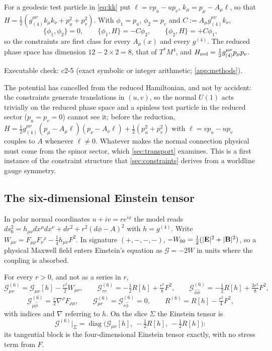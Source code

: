 \begin{proposition}
\label{prop:constraints}
For a geodesic test particle in \eqref{eq:kk} put $\ell=vp_u-up_v$, $k_\mu=p_\mu-A_\mu\ell$, so that $H=\tfrac12(g_{(4)}^{\mu\nu}k_\mu k_\nu+p_u^2+p_v^2)$. With
$\phi_1=p_u$, $\phi_2=p_v$ and $C:=A_\mu g_{(4)}^{\mu\nu}k_\nu$,
\[
\{\phi_1,\phi_2\}=0,\qquad \{\phi_1,H\}=-C\phi_2,\qquad \{\phi_2,H\}=+C\phi_1 ,
\]
so the constraints are first class for every $A_\mu(x)$ and every $g^{(4)}$. The reduced phase space has dimension $12-2\times2=8$, that of $T^*M^4$, and
$H_{\rm red}=\tfrac12g_{(4)}^{\mu\nu}p_\mu p_\nu$.
\end{proposition}

\noindent Executable check: c2-5 (exact symbolic or integer arithmetic; \cref{app:methods}).

The potential has cancelled from the reduced Hamiltonian, and not by accident: the constraints generate translations in $(u,v)$, so the normal $U(1)$
acts trivially on the reduced phase space and a spinless test particle in the reduced sector ($p_u=p_v=0$) cannot see it; before the reduction,
$H=\tfrac12g_{(4)}^{\mu\nu}(p_\mu-A_\mu\ell)(p_\nu-A_\nu\ell)+\tfrac12(p_u^2+p_v^2)$ with $\ell=vp_u-up_v$ couples to $A$ whenever $\ell\neq0$. Whatever makes the normal connection physical must come from the
spinor sector, which \cref{sec:transport} examines. This is a first instance of the constraint structure that \cref{sec:constraints} derives from a
worldline gauge symmetry.

\subsection{The six-dimensional Einstein tensor}
\label{sec:ambientEin}

In polar normal coordinates $u+iv=re^{i\phi}$ the model reads $ds_6^2=h_{\mu\nu}dx^\mu dx^\nu+dr^2+r^2(d\phi-A)^2$ with $h=g^{(4)}$. Write
$W_{\mu\nu}=F_{\mu\rho}F_\nu{}^\rho-\tfrac14h_{\mu\nu}F^2$. In signature $(+,-,-,-)$, $-W_{00}=\tfrac12(|\mathbf E|^2+|\mathbf B|^2)$, so a physical Maxwell field enters
Einstein's equation as $\mathcal G=-2W$ in units where the coupling is absorbed.

\begin{theorem}
\label{thm:ein6}
For every $r>0$, and not as a series in $r$,
\[
\mathcal G^{(6)}_{\mu\nu}=\mathcal G_{\mu\nu}[h]-\tfrac{r^2}2W_{\mu\nu},\qquad \mathcal G^{(6)}_{rr}=-\tfrac12R[h]+\tfrac{r^2}8F^2,\qquad
\mathcal G^{(6)}_{\hat\phi\hat\phi}=-\tfrac12R[h]+\tfrac{3r^2}8F^2,
\]
\[
\mathcal G^{(6)}_{\mu\hat\phi}=\tfrac r2\nabla^\rho F_{\rho\mu},\qquad \mathcal G^{(6)}_{\mu r}=\mathcal G^{(6)}_{r\hat\phi}=0,\qquad R^{(6)}=R[h]-\tfrac{r^2}4F^2,
\]
with indices and $\nabla$ referring to $h$. On the slice $\Sigma$ the Einstein tensor is
\[
\mathcal G^{(6)}\big|_\Sigma=\operatorname{diag}\bigl(\mathcal G_{\mu\nu}[h],\,-\tfrac12R[h],\,-\tfrac12R[h]\bigr):
\]
its tangential block is the four-dimensional Einstein tensor exactly, with no stress term from $F$.
\end{theorem}

